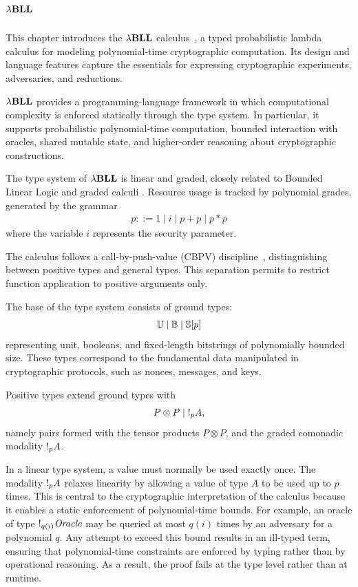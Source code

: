 \chapter{\texorpdfstring{${\lambda}\mathbf{BLL}$}{Lambda-BLL}}\label{chapter:lambll}
\lhead[\fancyplain{}{\bfseries\thepage}]{\fancyplain{}{\bfseries\rightmark}}
This chapter introduces the ${\lambda}\mathbf{BLL}$ calculus~\cite{lago2024computationalindistinguishabilitylogicalrelations}, a typed probabilistic lambda calculus for modeling polynomial-time cryptographic computation. Its design and language features capture the essentials for expressing cryptographic experiments, adversaries, and reductions.

${\lambda}\mathbf{BLL}$ provides a programming-language framework in which computational complexity is enforced statically through the type system. In particular, it supports probabilistic polynomial-time computation, bounded interaction with oracles, shared mutable state, and higher-order reasoning about cryptographic constructions.

The type system of ${\lambda}\mathbf{BLL}$ is linear and graded, closely related to Bounded Linear Logic \cite{GIRARD19921} and graded calculi \cite{distance-makets-types-stronger}. Resource usage is tracked by polynomial grades, generated by the grammar
\begin{align*}
p ::= 1 \mid i \mid p + p \mid p * p \tag{Polynomials}
\end{align*}
where the variable $i$ represents the security parameter.

The calculus follows a call-by-push-value (CBPV) discipline~\cite{levy2012call}, distinguishing between positive types and general types. This separation permits to restrict function application to positive arguments only.

The base of the type system consists of ground types:
\begin{align*}
\mathbb{U} \mid \mathbb{B} \mid \mathbb{S}[p] 
\end{align*}
representing unit, booleans, and fixed-length bitstrings of polynomially bounded size. These types correspond to the fundamental data manipulated in cryptographic protocols, such as nonces, messages, and keys.

Positive types extend ground types with
\begin{align*}
P \otimes P \mid \mathord{!}_p A,
\end{align*}
namely pairs formed with the tensor products $P \otimes P$, and the graded comonadic modality $\mathord{!}_p A$. 

In a linear type system, a value must normally be used exactly once. The modality $\mathord{!}_p A$ relaxes linearity by allowing a value of type $A$ to be used up to $p$ times. This is central to the cryptographic interpretation of the calculus because it enables a static enforcement of polynomial-time bounds. For example, an oracle of type $\mathord{!}_{q(i)} \mathit{Oracle}$ may be queried at most $q(i)$ times by an adversary for a polynomial $q$. Any attempt to exceed this bound results in an ill-typed term, ensuring that polynomial-time constraints are enforced by typing rather than by operational reasoning. As a result, the proof fails at the type level rather than at runtime.


